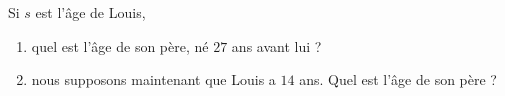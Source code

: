 
\begin{exercice}\label{exo2smath-0226}

    Si \( s\) est l'âge de Louis,
    \begin{enumerate}
        \item
            quel est l'âge de son père, né \( 27\) ans avant lui ?
        \item
            nous supposons maintenant que Louis a \( 14\) ans. Quel est l'âge de son père ?
    \end{enumerate}

\end{exercice}

